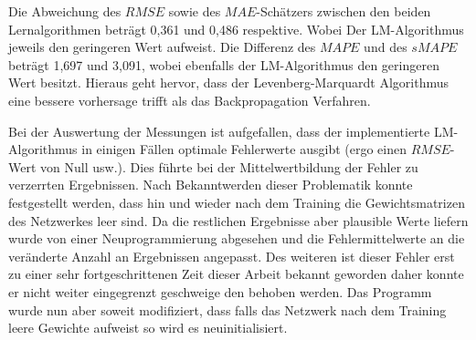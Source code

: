 Die Abweichung des $RMSE$ sowie des $MAE$-Schätzers zwischen den beiden Lernalgorithmen beträgt 0,361 und 0,486 respektive. Wobei Der LM-Algorithmus jeweils den geringeren Wert aufweist. Die Differenz des $MAPE$ und des $sMAPE$ beträgt 1,697 und 3,091, wobei ebenfalls der LM-Algorithmus den geringeren Wert besitzt. Hieraus geht hervor, dass der Levenberg-Marquardt Algorithmus eine bessere vorhersage trifft als das Backpropagation Verfahren. 

Bei der Auswertung der Messungen ist aufgefallen, dass der implementierte LM-Algorithmus in einigen Fällen optimale Fehlerwerte ausgibt (ergo einen $RMSE$-Wert von Null usw.). Dies führte bei der Mittelwertbildung der Fehler zu verzerrten Ergebnissen. Nach Bekanntwerden dieser Problematik konnte festgestellt werden, dass hin und wieder nach dem Training die Gewichtsmatrizen des Netzwerkes leer sind. Da die restlichen Ergebnisse aber plausible Werte liefern wurde von einer Neuprogrammierung abgesehen und die Fehlermittelwerte an die veränderte Anzahl an Ergebnissen angepasst. Des weiteren ist dieser Fehler erst zu einer sehr fortgeschrittenen Zeit dieser Arbeit bekannt geworden daher konnte er nicht weiter eingegrenzt geschweige den behoben werden. Das Programm wurde nun aber soweit modifiziert, dass falls das Netzwerk nach dem Training leere Gewichte aufweist so wird es neuinitialisiert.

